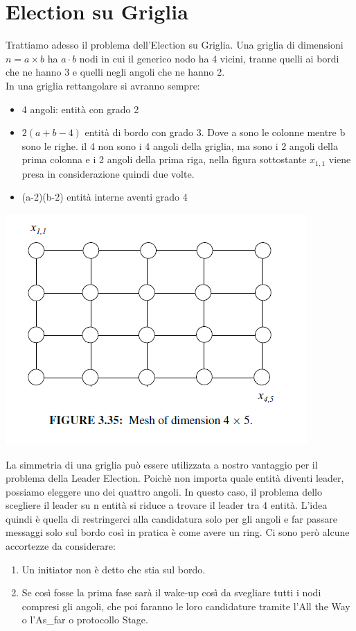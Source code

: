 \section{Election su Griglia}
Trattiamo adesso il problema dell'Election su Griglia.
Una griglia di dimensioni $n = a \times b$ ha $a \cdot b$ nodi in cui il generico nodo ha 4 vicini, tranne quelli ai bordi che ne hanno 3 e quelli negli angoli che ne hanno 2.\\
In una griglia rettangolare si avranno sempre:
\begin{itemize}
    \item 4 angoli: entità con grado 2
    \item $2(a+b-4)$ entità di bordo con grado 3. Dove a sono le colonne mentre b sono le righe. il 4 non sono i 4 angoli della griglia, ma sono i 2 angoli della prima colonna e i 2 angoli della prima riga, nella figura sottostante $x_{1,1}$ viene presa in considerazione quindi due volte.
    \item (a-2)(b-2) entità interne aventi grado 4
\end{itemize}
\begin{center}
      \includegraphics[scale=0.7]{images/griglia.png}
\end{center}

La simmetria di una griglia può essere utilizzata a nostro vantaggio per il problema della Leader Election. Poichè non importa quale entità diventi leader, possiamo eleggere uno dei quattro angoli. In questo caso, il problema dello scegliere il leader su n entità si riduce a trovare il leader tra 4 entità. L'idea quindi è quella di restringerci alla candidatura solo per gli angoli e far passare messaggi solo sul bordo così in pratica è come avere un ring.
Ci sono però alcune accortezze da considerare:
\begin{enumerate}
    \item Un initiator non è detto che stia sul bordo.
    \item Se così fosse la prima fase sarà il wake-up così da svegliare tutti i nodi compresi gli angoli, che poi faranno le loro candidature tramite l'All the Way o l'As\_far o protocollo Stage.
\end{enumerate}
